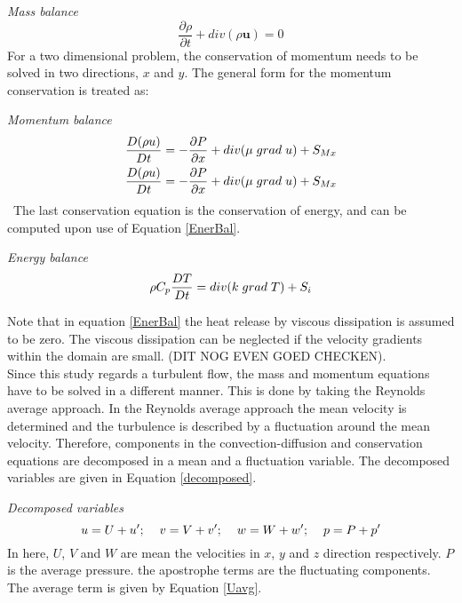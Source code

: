\documentclass{CFD2017}
\begin{document}
\emph{Mass balance}
\begin{equation}
\label{MassBal}
\frac{\partial \rho }{\partial t} + div(\rho\mathbf u)= 0
\end{equation}
For a two dimensional problem, the conservation of momentum needs to be solved in two directions, $x$ and $y$. The general form for the momentum conservation is treated as:\vspace{2mm}

\emph{Momentum balance}
\begin{equation}
\begin{split}
\label{MomBal}
&\frac{D( \rho u) }{D t} =-\frac{\partial P}{\partial x} + div(\mu \hspace{1mm} grad\hspace{1mm}u)+S_{Mx}\\ 
&\frac{D( \rho u) }{D t} =-\frac{\partial P}{\partial x} + div(\mu \hspace{1mm} grad\hspace{1mm}u)+S_{Mx}
\end{split}
\end{equation}\
The last conservation equation is the conservation of energy, and can be computed upon use of Equation \ref{EnerBal}.\vspace{2mm}

\emph{Energy balance}
\begin{equation}
\label{EnerBal}
\rho C_p\frac{D T }{D t} = div(k \hspace{1mm}grad\hspace{1mm}T) +S_i 
\end{equation}

Note that in equation \ref{EnerBal} the heat release by viscous dissipation is assumed to be zero. The viscous dissipation can be neglected if the velocity gradients within the domain are small. (DIT NOG EVEN GOED CHECKEN).\\
Since this study regards a turbulent flow, the mass and momentum equations have to be solved in a different manner. This is done by taking the Reynolds average approach. In the Reynolds average approach the mean velocity is determined and the turbulence is described by a fluctuation around the mean velocity. Therefore, components in the convection-diffusion and conservation equations are decomposed in a mean and a fluctuation variable. The decomposed variables are given in Equation \ref{decomposed}.\vspace{2mm}

\emph{Decomposed variables}
\begin{equation}
\label{decomposed}
u=U+u'; \hspace{4mm} v = V+v'; \hspace{4mm} w=W+w'; \hspace{4mm} p=P+p' 
\end{equation}
In here, $U$, $V$ and $W$ are mean the velocities in $x$, $y$ and $z$ direction respectively. $P$ is the average pressure. the apostrophe terms are the fluctuating components. The average term is given by Equation \ref{Uavg}.\vspace{2mm}
\end{document}
